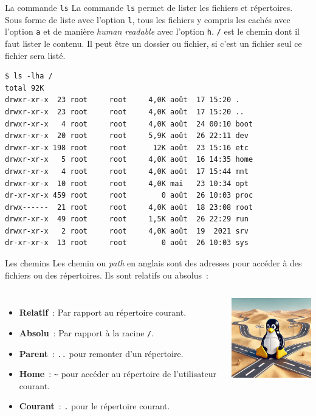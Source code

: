 \documentclass{beamer}
\begin{document}
    \begin{frame}[fragile]{La commande \lstinline{ls}}
        La commande \lstinline{ls} permet de lister les fichiers et répertoires.
        Sous forme de liste avec l'option \lstinline{l}, tous les fichiers y compris les cachés avec l'option \lstinline{a} et de manière \textit{human readable} avec l'option \lstinline{h}.
        \lstinline{/} est le chemin dont il faut lister le contenu.
        Il peut être un dossier ou fichier, si c'est un fichier seul ce fichier sera listé.
        \begin{lstlisting}
$ ls -lha /
total 92K
drwxr-xr-x  23 root     root     4,0K août  17 15:20 .
drwxr-xr-x  23 root     root     4,0K août  17 15:20 ..
drwxr-xr-x   4 root     root     4,0K août  24 00:10 boot
drwxr-xr-x  20 root     root     5,9K août  26 22:11 dev
drwxr-xr-x 198 root     root      12K août  23 15:16 etc
drwxr-xr-x   5 root     root     4,0K août  16 14:35 home
drwxr-xr-x   4 root     root     4,0K août  17 15:44 mnt
drwxr-xr-x  10 root     root     4,0K mai   23 10:34 opt
dr-xr-xr-x 459 root     root        0 août  26 10:03 proc
drwx------  21 root     root     4,0K août  18 23:08 root
drwxr-xr-x  49 root     root     1,5K août  26 22:29 run
drwxr-xr-x   2 root     root     4,0K août  19  2021 srv
dr-xr-xr-x  13 root     root        0 août  26 10:03 sys
        \end{lstlisting}
    \end{frame}

    \begin{frame}[fragile]{Les chemins}
        Les chemin ou \textit{path} en anglais sont des adresses pour accéder à des fichiers ou des répertoires.
        Ils sont relatifs ou absolus~:
        \bigbreak
        \begin{columns}
            \begin{itemize}
                \item \textbf{Relatif}~: Par rapport au répertoire courant.
                \item \textbf{Absolu}~: Par rapport à la racine \lstinline{/}.
                \item \textbf{Parent}~: \lstinline{..} pour remonter d'un répertoire.
                \item \textbf{Home}~: \lstinline{~} pour accéder au répertoire de l'utilisateur courant.
                \item \textbf{Courant}~: \lstinline{.} pour le répertoire courant.
            \end{itemize}
            \centering
            \includegraphics[width=4cm]{image/tux-path}
        \end{columns}
    \end{frame}
\end{document}
